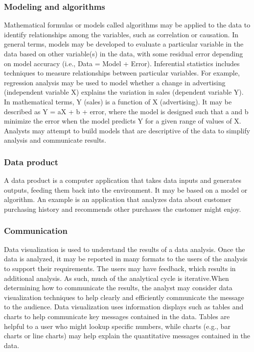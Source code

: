 \documentclass[a4paper,12pt,oneside]{report}
\begin{document}
{{\subsubsection{Modeling and algorithms}
{Mathematical formulas or models called algorithms may be applied to the data to identify relationships among the variables, such as correlation or causation. In general terms, models may be developed to evaluate a particular variable in the data based on other variable(s) in the data, with some residual error depending on model accuracy (i.e., Data = Model + Error).
Inferential statistics includes techniques to measure relationships between particular variables. For example, regression analysis may be used to model whether a change in advertising (independent variable X) explains the variation in sales (dependent variable Y). In mathematical terms, Y (sales) is a function of X (advertising). It may be described as Y = aX + b + error, where the model is designed such that a and b minimize the error when the model predicts Y for a given range of values of X. Analysts may attempt to build models that are descriptive of the data to simplify analysis and communicate results.}
\subsubsection{Data product}
{A data product is a computer application that takes data inputs and generates outputs, feeding them back into the environment. It may be based on a model or algorithm. An example is an application that analyzes data about customer purchasing history and recommends other purchases the customer might enjoy.}
\subsubsection{Communication}
{Data visualization is used to understand the results of a data analysis. Once the data is analyzed, it may be reported in many formats to the users of the analysis to support their requirements. The users may have feedback, which results in additional analysis. As such, much of the analytical cycle is iterative.When determining how to communicate the results, the analyst may consider data visualization techniques to help clearly and efficiently communicate the message to the audience. Data visualization uses information displays such as tables and charts to help communicate key messages contained in the data. Tables are helpful to a user who might lookup specific numbers, while charts (e.g., bar charts or line charts) may help explain the quantitative messages contained in the data.}
}}
\end{document}
